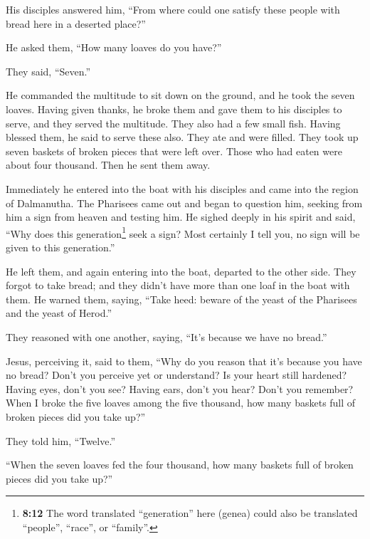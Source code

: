  His disciples answered him, ``From where could one
satisfy these people with bread here in a deserted place?''

 He asked them, ``How many loaves do you have?''

They said, ``Seven.''

 He commanded the multitude to sit down on the ground, and
he took the seven loaves. Having given thanks, he broke them and gave
them to his disciples to serve, and they served the multitude.
 They also had a few small fish. Having blessed them, he
said to serve these also.  They ate and were filled. They
took up seven baskets of broken pieces that were left over.
 Those who had eaten were about four thousand. Then he
sent them away.

 Immediately he entered into the boat with his disciples
and came into the region of Dalmanutha.  The Pharisees
came out and began to question him, seeking from him a sign from heaven
and testing him.  He sighed deeply in his spirit and
said, ``Why does this generation\footnote{\textbf{8:12} The word
  translated ``generation'' here (genea) could also be translated
  ``people'', ``race'', or ``family''.} seek a sign? Most certainly I
tell you, no sign will be given to this generation.''

 He left them, and again entering into the boat, departed
to the other side.  They forgot to take bread; and they
didn't have more than one loaf in the boat with them.  He
warned them, saying, ``Take heed: beware of the yeast of the Pharisees
and the yeast of Herod.''

 They reasoned with one another, saying, ``It's because
we have no bread.''

 Jesus, perceiving it, said to them, ``Why do you reason
that it's because you have no bread? Don't you perceive yet or
understand? Is your heart still hardened?  Having eyes,
don't you see? Having ears, don't you hear? Don't you remember?
 When I broke the five loaves among the five thousand,
how many baskets full of broken pieces did you take up?''

They told him, ``Twelve.''

 ``When the seven loaves fed the four thousand, how many
baskets full of broken pieces did you take up?''

